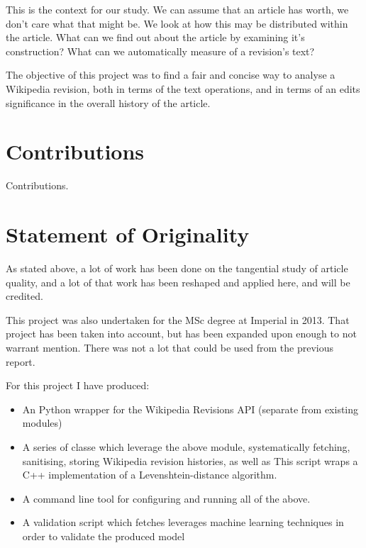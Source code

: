 This is the context for our study. We can assume that an article has
worth, we don't care what that might be. We look at how this
may be distributed within the article. What can we find out about the
article by examining it's construction? What can we automatically
measure of a revision's text?

The objective of this project was to find a fair and concise way to
analyse a Wikipedia revision, both in terms of the text operations,
and in terms of an edits significance in the overall history of the
article.

\section{Contributions}

Contributions.


\section{Statement of Originality}

As stated above, a lot of work has been done on the tangential study
of article quality, and a lot of that work has been reshaped and
applied here, and will be credited.

This project was also undertaken for the MSc degree at Imperial in
2013. That project has been taken into account, but has been expanded
upon enough to not warrant mention. There was not a lot that could be
used from the previous report.

For this project I have produced:
\begin{itemize}
\item An Python wrapper for the Wikipedia Revisions API (separate from
  existing modules)
\item A series of classe which leverage the above module, systematically
  fetching, sanitising, storing Wikipedia revision
  histories, as well as  This script wraps a C++ implementation
  of a Levenshtein-distance algorithm.  
\item A command line tool for configuring and running all of the above. 
\item A validation script which fetches leverages machine learning techniques
 in order to validate the produced model
\end{itemize}
